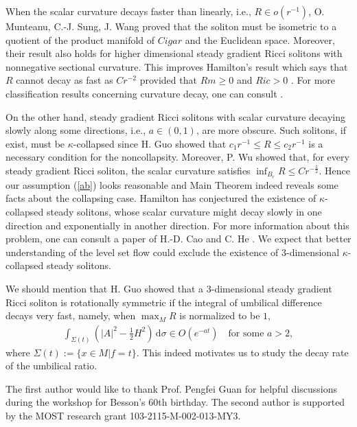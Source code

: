 \documentclass[12pt,a4paper]{amsart}
\begin{document}
When the scalar curvature decays faster than linearly, i.e., $R\in o(r^{-1})$, O. Munteanu,
C.-J. Sung, J. Wang \cite{MunteanuSungWang17} proved that the soliton must be isometric to a quotient of the product manifold of $Cigar$ and the Euclidean space.
Moreover, their result also holds for higher dimensional steady gradient Ricci solitons with nonnegative sectional curvature.
This improves Hamilton's result which says that $R$ cannot decay as fast as $Cr^{-2}$
provided that $Rm\geq 0$ and $Ric>0$ \cite[Theorem 9.44]{ChowLuNi06}.
For more classification results concerning curvature decay, one can consult \cite{Deruelle12,DengZhu15}.

On the other hand, steady gradient Ricci solitons with scalar curvature decaying slowly along some directions,
i.e., $a\in(0,1)$,
are more obscure. Such solitons, if exist, must be $\kappa$-collapsed since H. Guo \cite{Guo09}
showed that $c_1 r^{-1}\leq R\leq c_2 r^{-1}$ is a necessary condition for the noncollapsity.
Moreover, P. Wu \cite{Wu13} showed that, for every steady gradient Ricci soliton, the scalar curvature satisfies $\inf_{B_r}R\leq Cr^{-\frac{1}{2}}$.
Hence our assumption (\ref{ab}) looks reasonable and Main Theorem indeed reveals some facts about the collapsing case.
Hamilton has conjectured the existence of $\kappa$-collapsed steady solitons,
whose scalar curvature might decay slowly in one direction and exponentially in another direction.
For more information about this problem, one can consult a paper of H.-D. Cao and C. He \cite{CaoHe}.
We expect that better understanding of the level set flow could exclude the existence of 3-dimensional $\kappa$-collapsed steady solitons.

We should mention that H. Guo \cite{Guo10} showed that a $3$-dimensional steady
gradient Ricci soliton is rotationally symmetric if the integral of umbilical difference decays very fast, namely,
when $\max_M R$ is normalized to be $1$,
\begin{align*}
\int_{\Sigma(t)}\left(|A|^2-\frac{1}{2}H^2\right)\,\mathrm{d}\sigma\in O(e^{-at})\quad\mbox{for some } a>2,
\end{align*}
where $\Sigma(t):=\{x\in M|f=t\}$. This indeed motivates us to study the decay rate of the
umbilical ratio.

The first author would like to thank Prof. Pengfei Guan for helpful discussions during the workshop for Besson's 60th birthday.
The second author is supported by the MOST research grant 103-2115-M-002-013-MY3.
\end{document}
